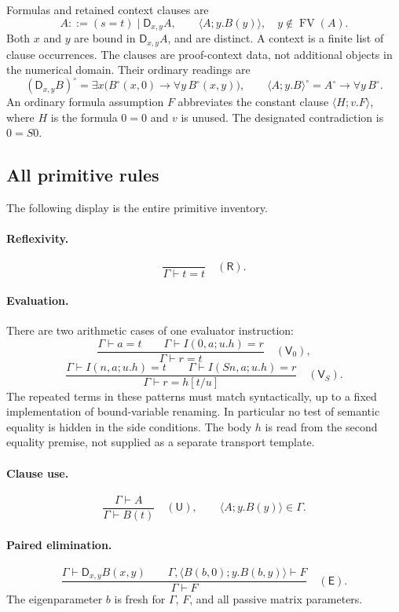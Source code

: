 \documentclass[11pt]{article}
\theoremstyle{definition}
\newcommand{\FV}{\mathop{\mathrm{FV}}}
\newcommand{\D}{\mathsf D}
\newcommand{\Use}{\mathsf U}
\newcommand{\Refl}{\mathsf R}
\newcommand{\Eval}{\mathsf V}
\newcommand{\cl}[2]{\langle #1;#2\rangle}
\begin{document}
Formulas and retained context clauses are
\[
 A ::= (s=t)\mid\D_{x,y}A,
 \qquad \cl{A}{y.B(y)},\quad y\notin\FV(A).
\]
Both $x$ and $y$ are bound in $\D_{x,y}A$, and are distinct. A context is
a finite list of clause occurrences. The clauses are proof-context data,
not additional objects in the numerical domain. Their ordinary readings are
\[
 (\D_{x,y}B)^\circ=\exists x\bigl(B^\circ(x,0)\to
                                  \forall y\,B^\circ(x,y)\bigr),
 \qquad
 \cl{A}{y.B}^\circ=A^\circ\to\forall y\,B^\circ.
\]
An ordinary formula assumption $F$ abbreviates the constant clause
$\cl{H}{v.F}$, where $H$ is the formula $0=0$ and $v$ is unused.
The designated contradiction is $0=S0$.

\subsection{All primitive rules}

The following display is the entire primitive inventory.
\paragraph{Reflexivity.}
\[
                 \frac{}{\Gamma\vdash t=t}\quad(\Refl).
\]
\paragraph{Evaluation.}
There are two arithmetic cases of one evaluator instruction:
\[
 \frac{\Gamma\vdash a=t\qquad
       \Gamma\vdash I(0,a;u.h)=r}
      {\Gamma\vdash r=t}\quad(\Eval_0),
\tag{V0}\label{rule:v0}
\]
\[
 \frac{\Gamma\vdash I(n,a;u.h)=t\qquad
       \Gamma\vdash I(Sn,a;u.h)=r}
      {\Gamma\vdash r=h[t/u]}\quad(\Eval_S).
\tag{VS}\label{rule:vs}
\]
The repeated terms in these patterns must match syntactically, up to a
fixed implementation of bound-variable renaming. In particular no test of
semantic equality is hidden in the side conditions. The body $h$ is read
from the second equality premise, not supplied as a separate transport
template.

\paragraph{Clause use.}
\[
 \frac{\Gamma\vdash A}{\Gamma\vdash B(t)}\quad(\Use),
 \qquad\cl{A}{y.B(y)}\in\Gamma.
\tag{U}\label{rule:u}
\]
\paragraph{Paired elimination.}
\[
 \frac{\Gamma\vdash\D_{x,y}B(x,y)\qquad
       \Gamma,\cl{B(b,0)}{y.B(b,y)}\vdash F}
      {\Gamma\vdash F}\quad(\mathsf E).
\tag{E}\label{rule:e}
\]
The eigenparameter $b$ is fresh for $\Gamma$, $F$, and all passive matrix
parameters.
\end{document}
